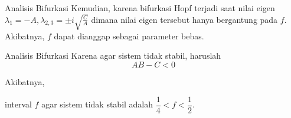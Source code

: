 \documentclass[aspectratio=169]{beamer}
\begin{document}
\begin{frame}{Analisis Bifurkasi}
    Kemudian, karena bifurkasi Hopf terjadi saat nilai eigen $\lambda_1 = -A, \lambda_{2,3}=\pm i\sqrt{\frac{C}{A}}$ dimana nilai eigen tersebut hanya bergantung pada $f$. Akibatnya, $f$ dapat dianggap sebagai parameter bebas.
\end{frame}

\begin{frame}{Analisis Bifurkasi}
    Karena agar sistem tidak stabil, haruslah
    $$AB - C < 0$$ %

    Akibatnya,

    interval $f$ agar sistem tidak stabil adalah $\dfrac{1}{4} < f < \dfrac{1}{2}$.
\end{frame}
\end{document}
